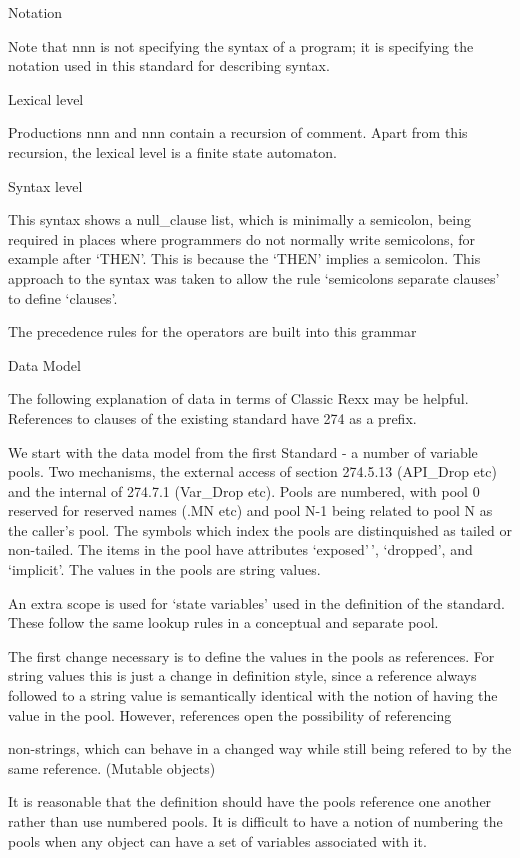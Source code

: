 Notation

Note that nnn is not specifying the syntax of a program; it is
specifying the notation used in this standard for describing syntax.

Lexical level

Productions nnn and nnn contain a recursion of comment. Apart from this
recursion, the lexical level is a finite state automaton.

Syntax level

This syntax shows a null\_clause list, which is minimally a semicolon,
being required in places where programmers do not normally write
semicolons, for example after `THEN'. This is because the `THEN' implies
a semicolon. This approach to the syntax was taken to allow the rule
`semicolons separate clauses' to define `clauses'.

The precedence rules for the operators are built into this grammar

Data Model

The following explanation of data in terms of Classic Rexx may be
helpful. References to clauses of the existing standard have 274 as a
prefix.

We start with the data model from the first Standard - a number of
variable pools. Two mechanisms, the external access of section 274.5.13
(API\_Drop etc) and the internal of 274.7.1 (Var\_Drop etc). Pools are
numbered, with pool 0 reserved for reserved names (.MN etc) and pool N-1
being related to pool N as the caller's pool. The symbols which index
the pools are distinquished as tailed or non-tailed. The items in the
pool have attributes `exposed'\,', `dropped', and `implicit'. The values
in the pools are string values.

An extra scope is used for `state variables' used in the definition of
the standard. These follow the same lookup rules in a conceptual and
separate pool.

The first change necessary is to define the values in the pools as
references. For string values this is just a change in definition style,
since a reference always followed to a string value is semantically
identical with the notion of having the value in the pool. However,
references open the possibility of referencing

non-strings, which can behave in a changed way while still being refered
to by the same reference. (Mutable objects)

It is reasonable that the definition should have the pools reference one
another rather than use numbered pools. It is difficult to have a notion
of numbering the pools when any object can have a set of variables
associated with it.

